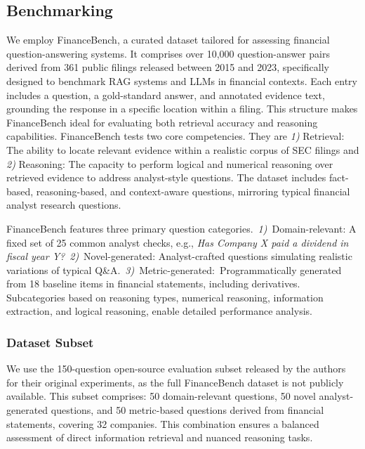 \documentclass[final,5p,times,twopage,twocolumn,a4paper]{elsarticle}
\begin{document}
\subsection{Benchmarking}
\label{sec:experimental_setup}
We employ FinanceBench, a curated dataset tailored for assessing financial question-answering systems. It comprises over 10,000 question-answer pairs derived from 361 public filings released between 2015 and 2023, specifically designed to benchmark RAG systems and LLMs in financial contexts. Each entry includes a question, a gold-standard answer, and annotated evidence text, grounding the response in a specific location within a filing. This structure makes FinanceBench ideal for evaluating both retrieval accuracy and reasoning capabilities. FinanceBench tests two core competencies. They are \textit{1)} Retrieval: The ability to locate relevant evidence within a realistic corpus of SEC filings and \textit{2)} Reasoning: The capacity to perform logical and numerical reasoning over retrieved evidence to address analyst-style questions. The dataset includes fact-based, reasoning-based, and context-aware questions, mirroring typical financial analyst research questions. 

FinanceBench features three primary question categories.~\textit{1)}~Domain-relevant: A fixed set of 25 common analyst checks, e.g., \textit{Has Company X paid a dividend in fiscal year Y?}~\textit{2)}~Novel-generated: Analyst-crafted questions simulating realistic variations of typical Q\&A.~\textit{3)}~Metric-generated:~Programmatically generated from 18 baseline items in financial statements, including derivatives. Subcategories based on reasoning types, numerical reasoning, information extraction, and logical reasoning, enable detailed performance analysis.

\subsubsection{Dataset Subset}
We use the 150-question open-source evaluation subset released by the authors for their original experiments, as the full FinanceBench dataset is not publicly available. This subset comprises: 50 domain-relevant questions, 50 novel analyst-generated questions, and 50 metric-based questions derived from financial statements, covering 32 companies. This combination ensures a balanced assessment of direct information retrieval and nuanced reasoning tasks.
\end{document}
